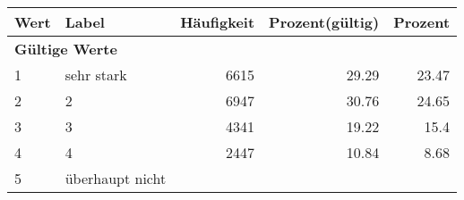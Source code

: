      \begin{longtable}{lXrrr}
     \toprule
     \textbf{Wert} & \textbf{Label} & \textbf{Häufigkeit} & \textbf{Prozent(gültig)} & \textbf{Prozent} \\
     \endhead
     \midrule
     \multicolumn{5}{l}{\textbf{Gültige Werte}}\\

     1 &
     \multicolumn{1}{X}{ sehr stark   } &


       \num{6615} &
       \num[round-mode=places,round-precision=2]{29,29} &
         \num[round-mode=places,round-precision=2]{23,47} \\

     2 &
     \multicolumn{1}{X}{ 2   } &


       \num{6947} &
       \num[round-mode=places,round-precision=2]{30,76} &
         \num[round-mode=places,round-precision=2]{24,65} \\

     3 &
     \multicolumn{1}{X}{ 3   } &


       \num{4341} &
       \num[round-mode=places,round-precision=2]{19,22} &
         \num[round-mode=places,round-precision=2]{15,4} \\

     4 &
     \multicolumn{1}{X}{ 4   } &


       \num{2447} &
       \num[round-mode=places,round-precision=2]{10,84} &
         \num[round-mode=places,round-precision=2]{8,68} \\

     5 &
     \multicolumn{1}{X}{ überhaupt nicht   } &



\end{longtable}
